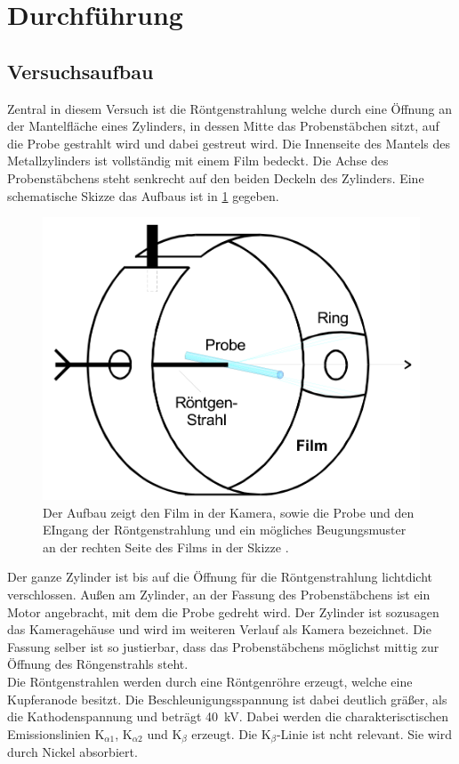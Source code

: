 \section{Durchführung}
\label{sec:Durchführung}
\subsection{Versuchsaufbau}
Zentral in diesem Versuch ist die Röntgenstrahlung welche durch eine Öffnung an der Mantelfläche eines Zylinders, in dessen Mitte das Probenstäbchen sitzt, auf die Probe gestrahlt wird und dabei gestreut wird. 
Die Innenseite des Mantels des Metallzylinders ist vollständig mit einem Film bedeckt.
Die Achse des Probenstäbchens steht senkrecht auf den beiden Deckeln des Zylinders. Eine schematische Skizze das Aufbaus ist in \ref{fig:Aufbau} gegeben.
\begin{figure}
	\centering
	\includegraphics[width = \textwidth]{Abbildungen/Aufbau.png}
	\caption{Der Aufbau zeigt den Film in der Kamera, sowie die Probe und den EIngang der Röntgenstrahlung und ein mögliches Beugungsmuster an der rechten Seite des Films in der Skizze \cite{Anleitung}. }
	\label{fig:Aufbau}
\end{figure}  
Der ganze Zylinder ist bis auf die Öffnung für die Röntgenstrahlung lichtdicht verschlossen.
Außen am Zylinder, an der Fassung des Probenstäbchens ist ein Motor angebracht, mit dem die Probe gedreht wird.
Der Zylinder ist sozusagen das Kameragehäuse und wird im weiteren Verlauf als Kamera bezeichnet. 
Die Fassung selber ist so justierbar, dass das Probenstäbchens möglichst mittig zur Öffnung des Röngenstrahls steht.\\
Die Röntgenstrahlen werden durch eine Röntgenröhre erzeugt, welche eine Kupferanode besitzt.
Die Beschleunigungsspannung ist dabei deutlich gräßer, als die Kathodenspannung und beträgt \SI{40}{\kV}. 
Dabei werden die charakterisctischen Emissionslinien K$_{\alpha 1}$, K$_{\alpha 2}$ und K$_\beta$ erzeugt. 
Die K$_\beta$-Linie ist ncht relevant.  
Sie wird durch Nickel absorbiert.

